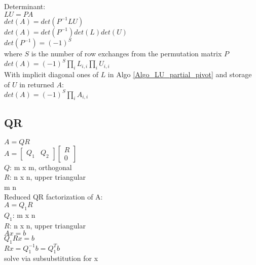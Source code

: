 \documentclass[8pt,letter]{article}
\begin{document}
\begin{multicols*}{2}
    Determinant:\\
    
    $LU=PA$\\
    $det(A) = det(P^{-1} LU)$\\
    $det(A) = det(P^{-1}) det(L) det(U)$\\
    $det(P^{-1}) = (-1)^S$\\
    where $S$ is the number of row exchanges from the permutation matrix $P$\\
    $det(A) = (-1)^S \prod_i L_{i,i} \prod_i U_{i,i}$\\
    With implicit diagonal ones of $L$ in Algo \ref{Algo_LU_partial_pivot} and storage of $U$ in returned $A$:\\
    $det(A) = (-1)^S \prod_i A_{i,i}$\\
    
    \vfill\null
    \pagebreak
    
    \subsection{QR}
    $A = QR$\\
    $A = \begin{bmatrix} Q_1 &Q_2 \end{bmatrix} \begin{bmatrix} R\\0 \end{bmatrix}$\\
    $Q$: m x m, orthogonal\\
    $R$: n x n, upper triangular\\
    m \geq n\\

    Reduced QR factorization of A:\\
    $A = Q_1 R$\\
    $Q_1$: m x n\\
    $R$: n x n, upper triangular\\

    $Ax = b$\\
    $Q_1 R x = b$\\
    $Rx = Q_1^{-1} b = Q_1^T b$\\
    solve via subsubstitution for x\\


\end{multicols*}
\end{document}
